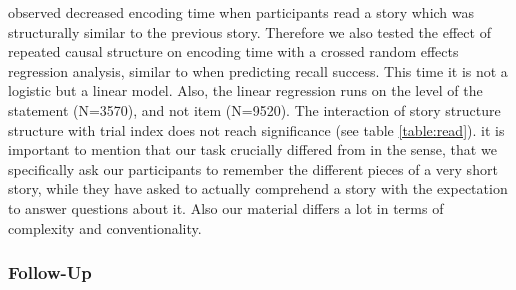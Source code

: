 \documentclass[a4paper,man,natbib,floatsintext,import]{apa6}
\begin{document}
\cite{Day2007} observed decreased encoding time when participants read a story which was structurally similar to the previous story. Therefore we also tested the effect of repeated causal structure on encoding time with a crossed random effects regression analysis, similar to when predicting recall success. This time it is not a logistic but a linear model. Also, the linear regression runs on the level of the statement (N=3570), and not item (N=9520). The interaction of story structure structure with trial index does not reach significance (see table \ref{table:read}). it is important to mention that our task crucially differed from \cite{Day2007} in the sense, that we specifically ask our participants to remember the different pieces of a very short story, while they have asked to actually comprehend a story with the expectation to answer questions about it. Also our material differs a lot in terms of complexity and conventionality.



\subsubsection{Follow-Up}
\end{document}
